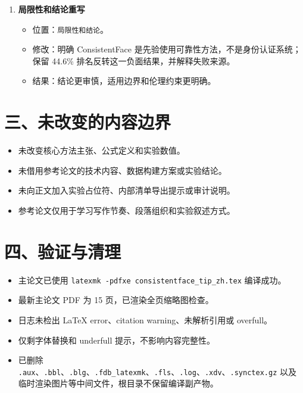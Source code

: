 \documentclass[UTF8,a4paper,zihao=-4]{ctexart}
\begin{document}
\begin{enumerate}
  \item \textbf{局限性和结论重写}
  \begin{itemize}
    \item 位置：\texttt{局限性和结论}。
    \item 修改：明确 ConsistentFace 是先验使用可靠性方法，不是身份认证系统；保留 44.6\% 排名反转这一负面结果，并解释失败来源。
    \item 结果：结论更审慎，适用边界和伦理约束更明确。
  \end{itemize}
\end{enumerate}

\section*{三、未改变的内容边界}

\begin{itemize}
  \item 未改变核心方法主张、公式定义和实验数值。
  \item 未借用参考论文的技术内容、数据构建方案或实验结论。
  \item 未向正文加入实验占位符、内部清单导出提示或审计说明。
  \item 参考论文仅用于学习写作节奏、段落组织和实验叙述方式。
\end{itemize}

\section*{四、验证与清理}

\begin{itemize}
  \item 主论文已使用 \texttt{latexmk -pdfxe consistentface\_tip\_zh.tex} 编译成功。
  \item 最新主论文 PDF 为 15 页，已渲染全页缩略图检查。
  \item 日志未检出 LaTeX error、citation warning、未解析引用或 overfull。
  \item 仅剩字体替换和 underfull 提示，不影响内容完整性。
  \item 已删除 \texttt{.aux}、\texttt{.bbl}、\texttt{.blg}、\texttt{.fdb\_latexmk}、\texttt{.fls}、\texttt{.log}、\texttt{.xdv}、\texttt{.synctex.gz} 以及临时渲染图片等中间文件，根目录不保留编译副产物。
\end{itemize}
\end{document}
